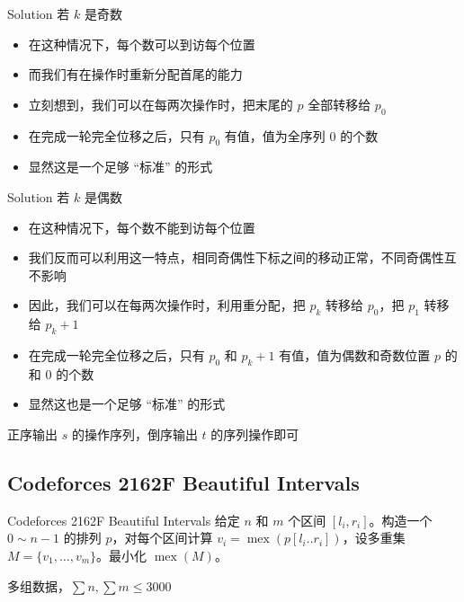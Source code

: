 ﻿\documentclass[aspectratio=169]{ctexbeamer}
\begin{document}
\begin{frame}{Solution}
    若 $k$ 是奇数
    \begin{itemize}
        \item 在这种情况下，每个数可以到访每个位置
        \item 而我们有在操作时重新分配首尾的能力
        \item 立刻想到，我们可以在每两次操作时，把末尾的 $p$ 全部转移给 $p_0$
        \item 在完成一轮完全位移之后，只有 $p_0$ 有值，值为全序列 $0$ 的个数
        \item 显然这是一个足够 “标准” 的形式
    \end{itemize}
\end{frame}

\begin{frame}{Solution}
    若 $k$ 是偶数
    \begin{itemize}
        \item 在这种情况下，每个数不能到访每个位置
        \item 我们反而可以利用这一特点，相同奇偶性下标之间的移动正常，不同奇偶性互不影响
        \item 因此，我们可以在每两次操作时，利用重分配，把 $p_k$ 转移给 $p_0$，把 $p_1$ 转移给 $p_k+1$
        \item 在完成一轮完全位移之后，只有 $p_0$ 和 $p_k+1$ 有值，值为偶数和奇数位置 $p$ 的和 $0$ 的个数
        \item 显然这也是一个足够 “标准” 的形式
    \end{itemize}
    正序输出 $s$ 的操作序列，倒序输出 $t$ 的序列操作即可
\end{frame}

\subsection{Codeforces 2162F Beautiful Intervals}
\begin{frame}{Codeforces 2162F Beautiful Intervals}
    给定 $n$ 和 $m$ 个区间 $[l_i,r_i]$。构造一个 $0\sim n-1$ 的排列 $p$，对每个区间计算 $v_i=\operatorname{mex}(p[l_i..r_i])$，设多重集 $M=\{v_1,\dots,v_m\}$。最小化 $\operatorname{mex}(M)$。
    
    多组数据，$\sum n,\sum m\le 3000$
\end{frame}
\end{document}
